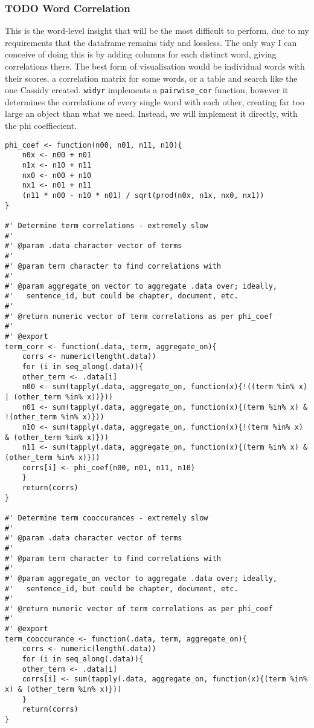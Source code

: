 \documentclass[a4paper, 11pt]{article}
\begin{document}
\subsubsection{{\bfseries\sffamily TODO} Word Correlation}
\label{sec:org25716cc}
This is the word-level insight that will be the most difficult to
perform, due to my requirements that the dataframe remains tidy and
lossless. The only way I can conceive of doing this is by adding
columns for each distinct word, giving correlations there. The best
form of visualisation would be individual words with their scores, a
correlation matrix for some words, or a table and search like the one
Cassidy created. \texttt{widyr} implements a \texttt{pairwise\_cor} function,
however it determines the correlations of every single word with each
other, creating far too large an object than what we need. Instead,
we will implement it directly, with the phi coeffiecient.
\begin{verbatim}
phi_coef <- function(n00, n01, n11, n10){
    n0x <- n00 + n01
    n1x <- n10 + n11
    nx0 <- n00 + n10
    nx1 <- n01 + n11
    (n11 * n00 - n10 * n01) / sqrt(prod(n0x, n1x, nx0, nx1))
}

#' Determine term correlations - extremely slow
#'
#' @param .data character vector of terms
#'
#' @param term character to find correlations with
#'
#' @param aggregate_on vector to aggregate .data over; ideally,
#'   sentence_id, but could be chapter, document, etc.
#'
#' @return numeric vector of term correlations as per phi_coef
#'
#' @export
term_corr <- function(.data, term, aggregate_on){
    corrs <- numeric(length(.data))
    for (i in seq_along(.data)){
	other_term <- .data[i]
	n00 <- sum(tapply(.data, aggregate_on, function(x){!((term %in% x) | (other_term %in% x))}))
	n01 <- sum(tapply(.data, aggregate_on, function(x){(term %in% x) & !(other_term %in% x)}))
	n10 <- sum(tapply(.data, aggregate_on, function(x){!(term %in% x) & (other_term %in% x)}))
	n11 <- sum(tapply(.data, aggregate_on, function(x){(term %in% x) & (other_term %in% x)}))
	corrs[i] <- phi_coef(n00, n01, n11, n10)
    }
    return(corrs)
}

#' Determine term cooccurances - extremely slow
#'
#' @param .data character vector of terms
#'
#' @param term character to find correlations with
#'
#' @param aggregate_on vector to aggregate .data over; ideally,
#'   sentence_id, but could be chapter, document, etc.
#'
#' @return numeric vector of term correlations as per phi_coef
#'
#' @export
term_cooccurance <- function(.data, term, aggregate_on){
    corrs <- numeric(length(.data))
    for (i in seq_along(.data)){
	other_term <- .data[i]
	corrs[i] <- sum(tapply(.data, aggregate_on, function(x){(term %in% x) & (other_term %in% x)}))
    }
    return(corrs)
}
\end{verbatim}
\end{document}
